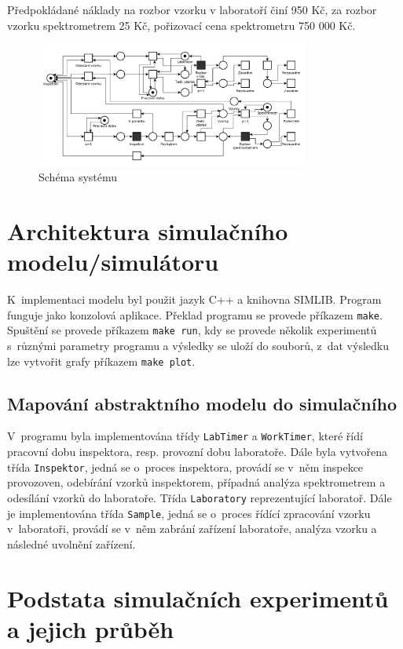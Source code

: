 \documentclass[11pt,a4paper]{article}
\begin{document}
Předpokládané náklady na rozbor vzorku v laboratoří činí 950 Kč, za rozbor
vzorku spektrometrem 25 Kč, pořizovací cena spektrometru 750 000 Kč. 


  \begin{figure}[h!]
    \centering
    \includegraphics[width=0.8\textwidth]{petri}
    \caption{Schéma systému}
    \label{petriner}
  \end{figure}

\section{Architektura simulačního modelu/simulátoru}
K~implementaci modelu byl použit jazyk C++ a knihovna SIMLIB.
Program funguje jako konzolová aplikace. Překlad programu se provede
příkazem \texttt{make}. Spuštění se provede příkazem \texttt{make run},
kdy se provede několik experimentů s~různými parametry programu a výsledky
se uloží do souborů, z~dat výsledku lze vytvořit grafy příkazem \texttt{make plot}.

\subsection{Mapování abstraktního modelu do simulačního}
V~programu byla implementována třídy \texttt{LabTimer} a \texttt{WorkTimer},
které řídí pracovní dobu inspektora, resp. provozní dobu laboratoře.
Dále byla vytvořena třída \texttt{Inspektor}, jedná se o~proces inspektora,
provádí se v~něm inspekce provozoven, odebírání vzorků inspektorem, případná 
analýza spektrometrem a odesílání vzorků do laboratoře. Třída \texttt{Laboratory}
reprezentující laboratoř. Dále je implementována třída \texttt{Sample}, jedná se
o~proces řídící zpracování vzorku v~laboratoři, provádí se v~něm zabrání zařízení laboratoře, analýza vzorku
a následné uvolnění zařízení.

\section{Podstata simulačních experimentů a jejich průběh}
\end{document}
